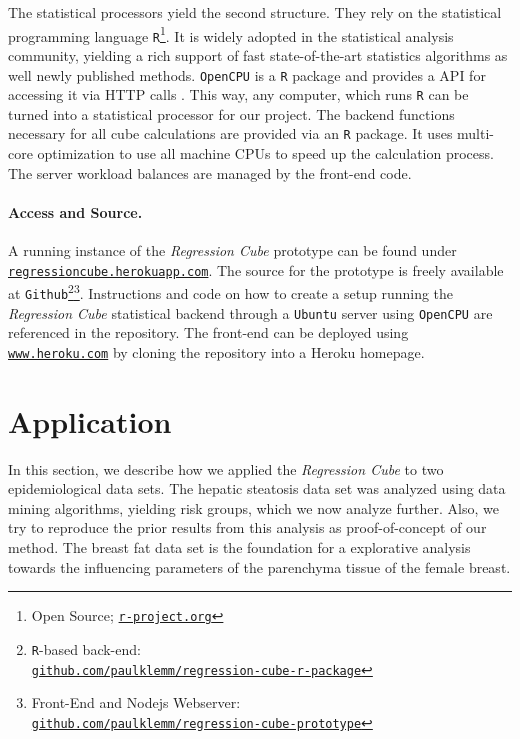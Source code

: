 \documentclass[journal]{style/vgtc} 			          %
\newcommand{\com}[1]{\textcolor{orange}{\uline{#1}}}
\begin{document}
The statistical processors yield the second structure.
They rely on the statistical programming language \texttt{R}\footnote{Open Source; \href{http://r-project.org}{\texttt{r-project.org}}}.
It is widely adopted in the statistical analysis community, yielding a rich support of fast state-of-the-art statistics algorithms as well newly published methods.
\texttt{OpenCPU} is a \texttt{R} package and provides a API for accessing it via HTTP calls \cite{Ooms}.
This way, any computer, which runs \texttt{R} can be turned into a statistical processor for our project.
The backend functions necessary for all cube calculations are provided via an \texttt{R} package.
It uses multi-core optimization to use all machine CPUs to speed up the calculation process.
The server workload balances are managed by the front-end code.

\paragraph{Access and Source.}
A running instance of the \emph{Regression Cube} prototype can be found under \href{http://regressioncube.herokuapp.com/}{\texttt{regressioncube.herokuapp.com}}.
The source for the prototype is freely available at \texttt{Github}\footnote{\texttt{R}-based back-end: \href{https://github.com/paulklemm/regression-cube-r-package}{\\\texttt{github.com/paulklemm/regression-cube-r-package}}}\footnote{Front-End and Nodejs Webserver: \href{https://github.com/paulklemm/regression-cube-prototype}{\texttt{\\github.com/paulklemm/regression-cube-prototype}}}.
Instructions and code on how to create a setup running the \emph{Regression Cube} statistical backend through a \texttt{Ubuntu} server using \texttt{OpenCPU} are referenced in the repository.
The front-end can be deployed using \href{https://www.heroku.com/}{\texttt{www.heroku.com}} by cloning the repository into a Heroku homepage. 

\section{Application} \label{application}
In this section, we describe how we applied the \emph{Regression Cube} to two epidemiological data sets.
The hepatic steatosis data set was analyzed using data mining algorithms, yielding risk groups, which we now analyze further.
Also, we try to reproduce the prior results from this analysis as proof-of-concept of our method.
The breast fat data set is the foundation for a explorative analysis towards the influencing parameters of the parenchyma tissue of the female breast.
\end{document}
